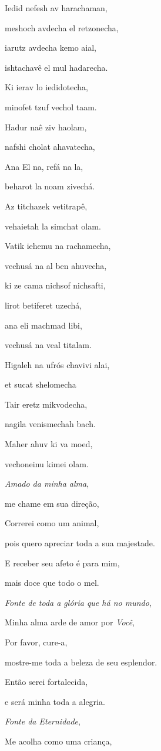 Iedid nefesh av harachaman,

meshoch avdecha el retzonecha,

iarutz avdecha kemo aial,

ishtachavê el mul hadarecha.

Ki ierav lo iedidotecha,

minofet tzuf vechol taam.

Hadur naê ziv haolam,

nafshi cholat ahavatecha,

Ana El na, refá na la,

beharot la noam zivechá.

Az titchazek vetitrapê,

vehaietah la simchat olam.

Vatik iehemu na rachamecha,

vechusá na al ben ahuvecha,

ki ze cama nichsof nichsafti,

lirot betiferet uzechá,

ana eli machmad libi,

vechusá na veal titalam.

Higaleh na ufrós chavivi alai,

et sucat shelomecha

Tair eretz mikvodecha,

nagila venismechah bach.

Maher ahuv ki va moed,

vechoneinu kimei olam.

\emph{Amado da minha alma},

me chame em sua direção,

Correrei como um animal,

pois quero apreciar toda a sua majestade.

E receber seu afeto é para mim,

mais doce que todo o mel.

\emph{Fonte de toda a glória que há no mundo},

Minha alma arde de amor por \emph{Você},

Por favor, cure-a,

mostre-me toda a beleza de seu esplendor.

Então serei fortalecida,

e será minha toda a alegria.

\emph{Fonte da Eternidade},

Me acolha como uma criança,

